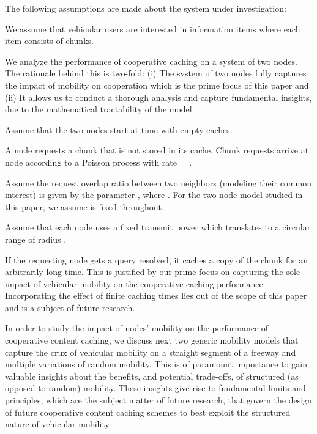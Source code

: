 \documentclass[conference,a4paper]{IEEEtran}
\begin{document}
The following assumptions are made about the system under investigation:
\begin{itemize*}
\item We assume that vehicular users are interested in information items where each item consists of  chunks.
\item We analyze the performance of cooperative caching on a system of two nodes. The rationale behind this is two-fold: (i) The system of two nodes fully captures the impact of mobility on cooperation which is the prime focus of this paper and (ii) It allows us to conduct a thorough analysis and capture fundamental insights, due to the mathematical tractability of the model.
\item Assume that the two nodes start at time  with empty caches.
\item A node requests a chunk that is not stored in its cache. Chunk requests arrive at node  according to a Poisson process with rate  = .
\item Assume the request overlap ratio between two neighbors (modeling their common interest) is given by the parameter , where . For the two node model studied in this paper, we assume  is fixed throughout.
\item Assume that each node uses a fixed transmit power which translates to a circular range of radius .
\item If the requesting node gets a query resolved, it caches a copy of the chunk for an arbitrarily long time. This is justified by our prime focus on capturing the sole impact of vehicular mobility on the cooperative caching performance. Incorporating the effect of finite caching times lies out of the scope of this paper and is a subject of future research.
\end{itemize*}

In order to study the impact of nodes' mobility on the performance of cooperative content caching, we discuss next two generic mobility models that capture the crux of vehicular mobility on a straight segment of a freeway and multiple variations of random mobility. This is of paramount importance to gain valuable insights about the benefits, and potential trade-offs, of structured (as opposed to random) mobility. These insights give rise to fundamental limits and principles, which are the subject matter of future research, that govern the design of future cooperative content caching schemes to best exploit the structured nature of vehicular mobility.
\end{document}
